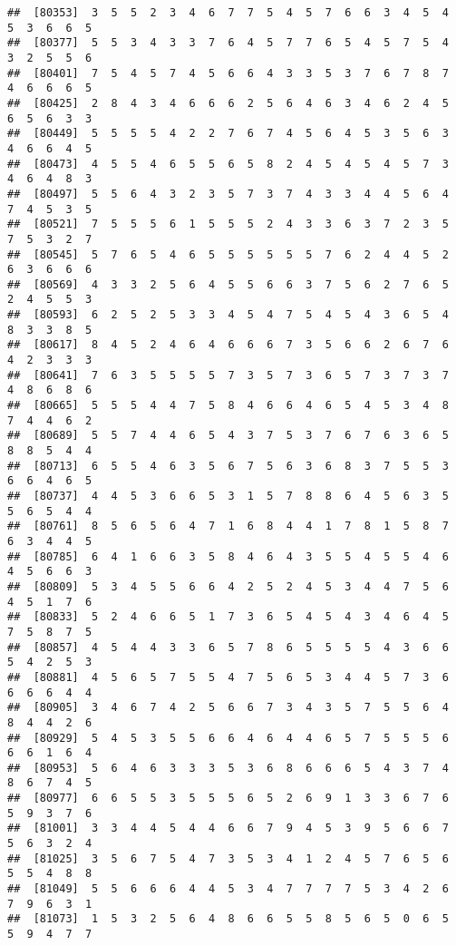 \documentclass[
]{book}
\begin{document}
\begin{verbatim}
##  [80353]  3  5  5  2  3  4  6  7  7  5  4  5  7  6  6  3  4  5  4  5  3  6  6  5
##  [80377]  5  5  3  4  3  3  7  6  4  5  7  7  6  5  4  5  7  5  4  3  2  5  5  6
##  [80401]  7  5  4  5  7  4  5  6  6  4  3  3  5  3  7  6  7  8  7  4  6  6  6  5
##  [80425]  2  8  4  3  4  6  6  6  2  5  6  4  6  3  4  6  2  4  5  6  5  6  3  3
##  [80449]  5  5  5  5  4  2  2  7  6  7  4  5  6  4  5  3  5  6  3  4  6  6  4  5
##  [80473]  4  5  5  4  6  5  5  6  5  8  2  4  5  4  5  4  5  7  3  4  6  4  8  3
##  [80497]  5  5  6  4  3  2  3  5  7  3  7  4  3  3  4  4  5  6  4  7  4  5  3  5
##  [80521]  7  5  5  5  6  1  5  5  5  2  4  3  3  6  3  7  2  3  5  7  5  3  2  7
##  [80545]  5  7  6  5  4  6  5  5  5  5  5  5  7  6  2  4  4  5  2  6  3  6  6  6
##  [80569]  4  3  3  2  5  6  4  5  5  6  6  3  7  5  6  2  7  6  5  2  4  5  5  3
##  [80593]  6  2  5  2  5  3  3  4  5  4  7  5  4  5  4  3  6  5  4  8  3  3  8  5
##  [80617]  8  4  5  2  4  6  4  6  6  6  7  3  5  6  6  2  6  7  6  4  2  3  3  3
##  [80641]  7  6  3  5  5  5  5  7  3  5  7  3  6  5  7  3  7  3  7  4  8  6  8  6
##  [80665]  5  5  5  4  4  7  5  8  4  6  6  4  6  5  4  5  3  4  8  7  4  4  6  2
##  [80689]  5  5  7  4  4  6  5  4  3  7  5  3  7  6  7  6  3  6  5  8  8  5  4  4
##  [80713]  6  5  5  4  6  3  5  6  7  5  6  3  6  8  3  7  5  5  3  6  6  4  6  5
##  [80737]  4  4  5  3  6  6  5  3  1  5  7  8  8  6  4  5  6  3  5  5  6  5  4  4
##  [80761]  8  5  6  5  6  4  7  1  6  8  4  4  1  7  8  1  5  8  7  6  3  4  4  5
##  [80785]  6  4  1  6  6  3  5  8  4  6  4  3  5  5  4  5  5  4  6  4  5  6  6  3
##  [80809]  5  3  4  5  5  6  6  4  2  5  2  4  5  3  4  4  7  5  6  4  5  1  7  6
##  [80833]  5  2  4  6  6  5  1  7  3  6  5  4  5  4  3  4  6  4  5  7  5  8  7  5
##  [80857]  4  5  4  4  3  3  6  5  7  8  6  5  5  5  5  4  3  6  6  5  4  2  5  3
##  [80881]  4  5  6  5  7  5  5  4  7  5  6  5  3  4  4  5  7  3  6  6  6  6  4  4
##  [80905]  3  4  6  7  4  2  5  6  6  7  3  4  3  5  7  5  5  6  4  8  4  4  2  6
##  [80929]  5  4  5  3  5  5  6  6  4  6  4  4  6  5  7  5  5  5  6  6  6  1  6  4
##  [80953]  5  6  4  6  3  3  3  5  3  6  8  6  6  6  5  4  3  7  4  8  6  7  4  5
##  [80977]  6  6  5  5  3  5  5  5  6  5  2  6  9  1  3  3  6  7  6  5  9  3  7  6
##  [81001]  3  3  4  4  5  4  4  6  6  7  9  4  5  3  9  5  6  6  7  5  6  3  2  4
##  [81025]  3  5  6  7  5  4  7  3  5  3  4  1  2  4  5  7  6  5  6  5  5  4  8  8
##  [81049]  5  5  6  6  6  4  4  5  3  4  7  7  7  7  5  3  4  2  6  7  9  6  3  1
##  [81073]  1  5  3  2  5  6  4  8  6  6  5  5  8  5  6  5  0  6  5  5  9  4  7  7

\end{verbatim}
\end{document}
